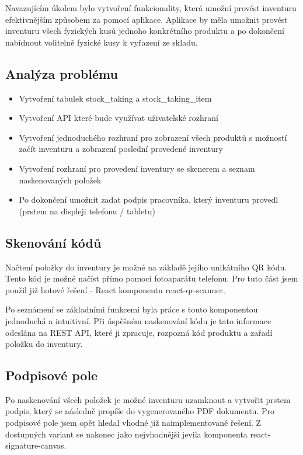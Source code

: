 Navazujícím úkolem bylo vytvoření funkcionality, která umožní provést inventuru efektivnějším způsobem za pomocí aplikace. Aplikace by měla umožnit provést inventuru všech fyzických kusů jednoho konkrétního produktu a po dokončení nabídnout volitelně fyzické kusy k vyřazení ze skladu. 

\subsection{Analýza problému}

\begin{itemize}
    \item Vytvoření tabulek stock\_taking a stock\_taking\_item
    \item Vytvoření API které bude využívat uživatelské rozhraní
    \item Vytvoření jednoduchého rozhraní pro zobrazení všech produktů s možností začít inventuru a zobrazení poslední provedené inventury
    \item Vytvoření rozhraní pro provedení inventury se skenerem a seznam naskenovaných položek
    \item Po dokončení umožnit zadat podpis pracovníka, který inventuru provedl (prstem na displeji telefonu / tabletu)
\end{itemize}

\subsection{Skenování kódů}

Načtení položky do inventury je možné na základě jejího unikátního QR kódu. Tento kód je možné načíst přímo pomocí fotoaparátu telefonu. Pro tuto část jsem použil již hotové řešení - React komponentu react-qr-scanner. 

Po seznámení se základními funkcemi byla práce s touto komponentou jednoduchá a intuitivní. Při úspěšném naskenování kódu je tato informace odeslána na REST API, které ji zpracuje, rozpozná kód produktu a zařadí položku do inventury. 

\subsection{Podpisové pole}

Po naskenování všech položek je možné inventuru uzamknout a vytvořit prstem podpis, který se následně propíše do vygenerovaného PDF dokumentu. Pro podpisové pole jsem opět hledal vhodné již naimplementované řešení. Z dostupných variant se nakonec jako nejvhodnější jevila komponenta react-signature-canvas. 

